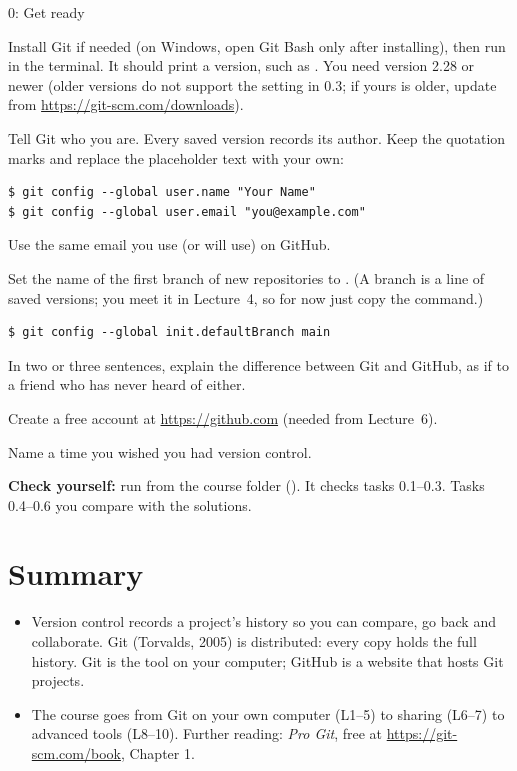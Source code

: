 \begin{homework}{0: Get ready}
\begin{description}[leftmargin=1.2em,style=nextline]
\item[0.1 Install] Install Git if needed (on Windows, open Git Bash only after installing), then run  in the terminal. It should print a version, such as . You need version 2.28 or newer (older versions do not support the setting in 0.3; if yours is older, update from \url{https://git-scm.com/downloads}).
\item[0.2 Introduce yourself] Tell Git who you are. Every saved version records its author. Keep the quotation marks and replace the placeholder text with your own:
\begin{lstlisting}
$ git config --global user.name "Your Name"
$ git config --global user.email "you@example.com"
\end{lstlisting}
Use the same email you use (or will use) on GitHub.
\item[0.3 Default branch name] Set the name of the first branch of new repositories to . (A branch is a line of saved versions; you meet it in Lecture~4, so for now just copy the command.)
\begin{lstlisting}
$ git config --global init.defaultBranch main
\end{lstlisting}
\item[0.4 Short answer] In two or three sentences, explain the difference between Git and GitHub, as if to a friend who has never heard of either.
\item[0.5 GitHub account] Create a free account at \url{https://github.com} (needed from Lecture~6).
\item[0.6 Thinking] Name a time you wished you had version control.
\end{description}
\textbf{Check yourself:} run  from the course folder (). It checks tasks 0.1--0.3. Tasks 0.4--0.6 you compare with the solutions.
\end{homework}

\section{Summary}

\begin{itemize}
  \item Version control records a project's history so you can compare, go back and collaborate. Git (Torvalds, 2005) is distributed: every copy holds the full history. Git is the tool on your computer; GitHub is a website that hosts Git projects.
  \item The course goes from Git on your own computer (L1--5) to sharing (L6--7) to advanced tools (L8--10). Further reading: \emph{Pro Git}, free at \url{https://git-scm.com/book}, Chapter 1.
\end{itemize}

\solutionspage




